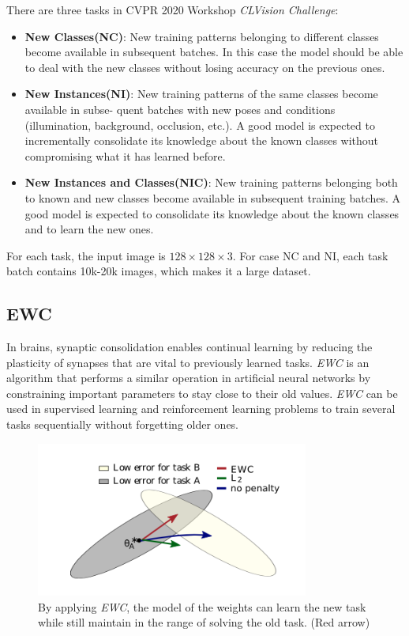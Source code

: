 There are three tasks in CVPR 2020 Workshop \textit{CLVision Challenge}:
\begin{itemize}
\item \textbf{New Classes(NC)}: New training patterns belonging to different classes become available in subsequent batches. In this case the model should be able to deal with the new classes without losing accuracy on the previous ones.
\item \textbf{New Instances(NI)}: New training patterns of the same classes become available in subse- quent batches with new poses and conditions (illumination, background, occlusion, etc.). A good model is expected to incrementally consolidate its knowledge about the known classes without compromising what it has learned before.
\item \textbf{New Instances and Classes(NIC)}: New training patterns belonging both to known and new classes become available in subsequent training batches. A good model is expected to consolidate its knowledge about the known classes and to learn the new ones.
\end{itemize}
For each task, the input image is $128\times128\times3$. For case NC and NI, each task batch contains 10k-20k images, which makes it a large dataset.

\subsection{EWC}
In brains, synaptic consolidation enables continual learning by reducing the plasticity of synapses that are vital to previously learned tasks.  \textit{EWC} is an algorithm that performs a similar operation in artificial neural networks by constraining important parameters to stay close to their old values. \textit{EWC} can be used in supervised learning and reinforcement learning problems to train several tasks sequentially without forgetting older ones.

\begin{figure}[h]
  \centering
  \captionsetup{width=0.6\textwidth}
  \includegraphics[width=0.8\textwidth]{figure/ewc.png}
  \caption{By applying \textit{EWC}, the model of the weights can learn the new task while still maintain in the range of solving the old task. (Red arrow)}
  \label{EWC}
\end{figure}

